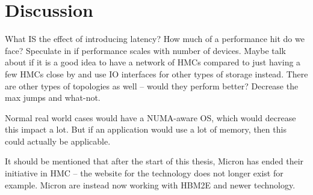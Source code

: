 \chapter{Discussion}
What IS the effect of introducing latency? How much of a performance hit do we face? Speculate in if performance scales with number of devices. Maybe talk about if it is a good idea to have a network of HMCs compared to just having a few HMCs close by and use IO interfaces for other types of storage instead. There are other types of topologies as well -- would they perform better? Decrease the max jumps and what-not.

Normal real world cases would have a NUMA-aware OS, which would decrease this impact a lot. But if an application would use a lot of memory, then this could actually be applicable. 

It should be mentioned that after the start of this thesis, Micron has ended their initiative in HMC -- the website for the technology does not longer exist for example. Micron are instead now working with HBM2E and newer technology. 